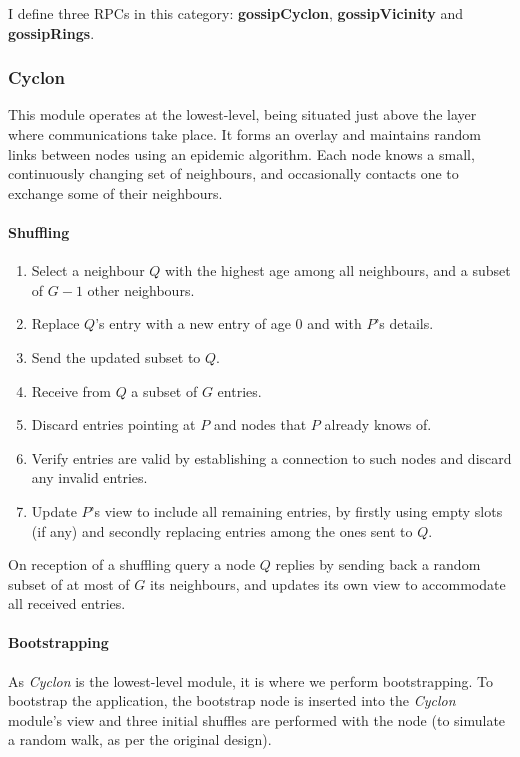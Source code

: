 \documentclass[10pt,a4paper,onecolumn]{article}
\begin{document}
I define three RPCs in this category: \textbf{gossipCyclon}, \textbf{gossipVicinity} and \textbf{gossipRings}.

\subsubsection{Cyclon}
This module operates at the lowest-level, being situated just above the layer where communications take place. It forms an overlay and maintains random links between nodes using an epidemic algorithm. Each node knows a small, continuously changing set of neighbours, and occasionally contacts one to exchange some of their neighbours.

\paragraph*{Shuffling}
\begin{enumerate}
\item Select a neighbour $Q$ with the highest age among all neighbours, and a subset of $G-1$ other neighbours.
\item Replace $Q$'s entry with a new entry of age 0 and with $P$'s details.
\item Send the updated subset to $Q$.
\item Receive from $Q$ a subset of $G$ entries.
\item Discard entries pointing at $P$ and nodes that $P$ already knows of.
\item Verify entries are valid by establishing a connection to such nodes and discard any invalid entries.
\item Update $P$'s view to include all remaining entries, by firstly using empty slots (if any) and secondly replacing entries among the ones sent to $Q$.
\end{enumerate}

On reception of a shuffling query a node $Q$ replies by sending back a random subset of at most of $G$ its neighbours, and updates its own view to accommodate all received entries.

\paragraph*{Bootstrapping}
As \textit{Cyclon} is the lowest-level module, it is where we perform bootstrapping. To bootstrap the application, the bootstrap node is inserted into the \textit{Cyclon} module's view and three initial shuffles are performed with the node (to simulate a random walk, as per the original design).
\end{document}
